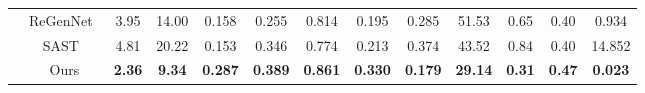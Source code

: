 \begin{table*}[]
{\begin{tabular}{c|c|ccccccccccc}
                            & ReGenNet~\cite{xu2024regennet}   & 3.95          & 14.00          & 0.158          & 0.255          & 0.814          & 0.195          & 0.285          & 51.53          & 0.65          & 0.40          & 0.934          \\ \cline{2-13} 
                            & SAST~\cite{mueller2024massively} & 4.81          & 20.22          & 0.153          & 0.346          & 0.774          & 0.213          & 0.374          & 43.52          & 0.84          & 0.40          & 14.852         \\ \cline{2-13} 
                            & Ours                                                   & \textbf{2.36} & \textbf{9.34}  & \textbf{0.287} & \textbf{0.389} & \textbf{0.861} & \textbf{0.330} & \textbf{0.179} & \textbf{29.14} & \textbf{0.31} & \textbf{0.47} & \textbf{0.023} \\ \hline
\end{tabular}
}
\label{tab:hhi}
\end{table*}



